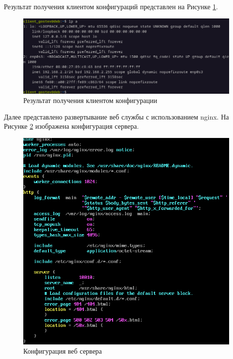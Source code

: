 \documentclass[14pt, a4paper]{extarticle}
\numberwithin{equation}{section}
\begin{document}
Результат получения клиентом конфигураций представлен на Рисунке \ref{fig:dhcp_proof}.

\begin{figure}[H]
        \centering
        \includegraphics[scale=0.8]{services/dhcp/clientproofdhcp.png}
        \caption{Результат получения клиентом конфигурации}
        \label{fig:dhcp_proof}
\end{figure}


Далее представлено развертывание веб службы с использованием nginx. На Рисунке \ref{fig:web_server_cfg} изображена конфигурация сервера.
\begin{figure}[H]
        \centering
        \includegraphics[scale=0.8]{services/web/server_cfg.png}
        \caption{Конфигурация веб сервера}
        \label{fig:web_server_cfg}
\end{figure}
\end{document}
